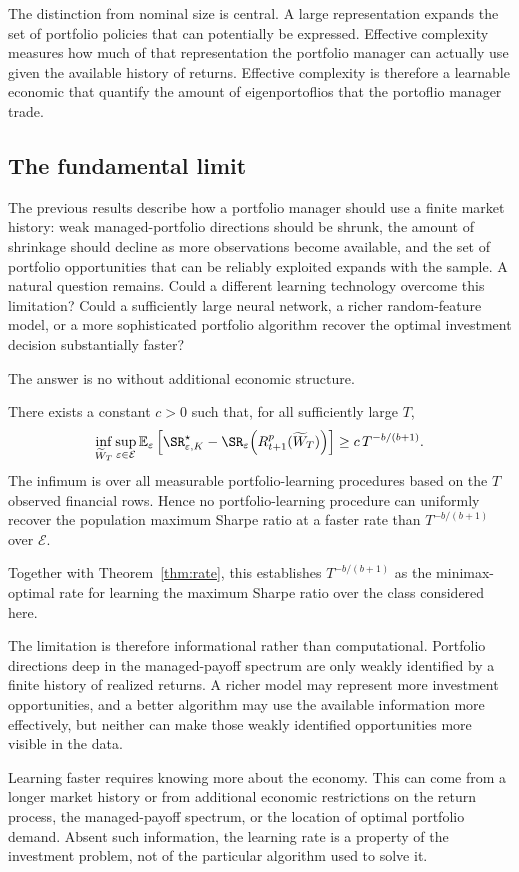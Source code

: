 The distinction from nominal size is central. A large representation expands
the set of portfolio policies that can potentially be expressed. Effective
complexity measures how much of that representation the portfolio manager can
actually use given the available history of returns. Effective complexity is therefore a
learnable economic that quantify the amount of eigenportoflios that the portoflio manager trade.






\subsection{The fundamental limit}
\label{sec:minimax}

The previous results describe how a portfolio manager should use a finite
market history: weak managed-portfolio directions should be shrunk, the amount
of shrinkage should decline as more observations become available, and the
set of portfolio opportunities that can be reliably exploited expands with
the sample. A natural question remains. Could a different learning technology
overcome this limitation? Could a sufficiently large neural network, a richer
random-feature model, or a more sophisticated portfolio algorithm recover the
optimal investment decision substantially faster?

The answer is no without additional economic structure.

\begin{theorem}
\label{thm:minimax_words}
There exists a constant $c>0$ such that, for all sufficiently large $T$,
\[
\inf_{\widetilde W_T}
\sup_{\varepsilon\in\mathcal E}
\mathbb E_\varepsilon
\left[
\SR^\star_{\varepsilon,K}
-
\SR_\varepsilon
\!\left(
R^p_{t+1}(\widetilde W_T)
\right)
\right]
\ge
c\,T^{-b/(b+1)}.
\]
The infimum is over all measurable portfolio-learning procedures based on the
$T$ observed financial rows. Hence no portfolio-learning procedure can
uniformly recover the population maximum Sharpe ratio at a faster rate than
$T^{-b/(b+1)}$ over $\mathcal E$.
\end{theorem}

Together with Theorem~\ref{thm:rate}, this establishes $T^{-b/(b+1)}$ as the minimax-optimal rate for learning the maximum Sharpe ratio over the class considered here.

The limitation is therefore informational rather than computational. Portfolio
directions deep in the managed-payoff spectrum are only weakly identified by a
finite history of realized returns. A richer model may represent more
investment opportunities, and a better algorithm may use the available
information more effectively, but neither can make those weakly identified
opportunities more visible in the data.

Learning faster requires knowing more about the economy. This can come from a
longer market history or from additional economic restrictions on the return
process, the managed-payoff spectrum, or the location of optimal portfolio
demand. Absent such information, the learning rate is a property of the
investment problem, not of the particular algorithm used to solve it.